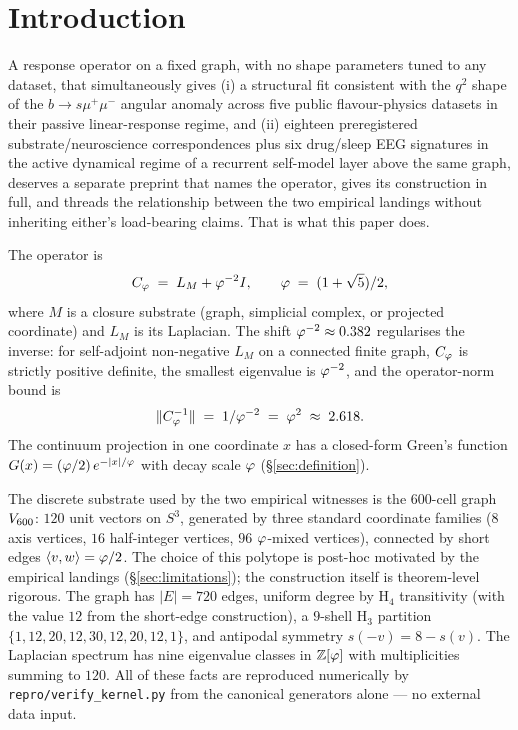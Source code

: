 \section{Introduction}\label{sec:intro}

A response operator on a fixed graph, with no shape parameters
tuned to any dataset, that simultaneously gives (i) a structural
fit consistent with the $q^{2}$ shape of the
$b\to s\mu^{+}\mu^{-}$ angular anomaly across five public
flavour-physics datasets in their passive linear-response regime,
and (ii) eighteen preregistered substrate/neuroscience
correspondences plus six drug/sleep EEG signatures in the active
dynamical regime of a
recurrent self-model layer above the same graph, deserves a separate
preprint that names the operator, gives its construction in full,
and threads the relationship between the two empirical landings
without inheriting either's load-bearing claims. That is what this
paper does.

The operator is
\begin{equation}\label{eq:cphi_intro}
C_{\varphi} \;=\; L_M + \varphi^{-2} I,
\qquad \varphi \;=\; (1+\sqrt{5})/2,
\end{equation}
where $M$ is a closure substrate (graph, simplicial complex, or
projected coordinate) and $L_M$ is its Laplacian. The shift
$\varphi^{-2} \approx 0.382$ regularises the inverse: for self-adjoint
non-negative $L_M$ on a connected finite graph, $C_{\varphi}$ is strictly
positive definite, the smallest eigenvalue is $\varphi^{-2}$, and the
operator-norm bound is
\begin{equation}\label{eq:opnorm_intro}
\|C_{\varphi}^{-1}\| \;=\; 1/\varphi^{-2} \;=\; \varphi^{2} \;\approx\; 2.618.
\end{equation}
The continuum projection in one coordinate $x$ has a closed-form
Green's function $G(x) = (\varphi/2)\,e^{-|x|/\varphi}$ with decay scale
$\varphi$ (\S\ref{sec:definition}).

The discrete substrate used by the two empirical witnesses is
the 600-cell graph $V_{600}$: $120$ unit vectors on $S^{3}$,
generated by three standard coordinate families ($8$ axis vertices,
$16$ half-integer vertices, $96$ $\varphi$-mixed vertices), connected by
short edges $\langle v, w\rangle = \varphi/2$. The choice of this
polytope is post-hoc motivated by the empirical landings
(\S\ref{sec:limitations}); the construction itself is theorem-level
rigorous. The graph has $|E|=720$ edges, uniform degree by H$_4$
transitivity (with the value $12$ from the short-edge
construction), a $9$-shell H$_3$ partition
$\{1,12,20,12,30,12,20,12,1\}$, and antipodal symmetry
$s(-v) = 8 - s(v)$. The Laplacian spectrum has nine eigenvalue
classes in $\mathbb{Z}[\varphi]$ with multiplicities summing to $120$.
All of these facts are reproduced numerically by
\texttt{repro/verify\_kernel.py} from the canonical generators
alone — no external data input.

